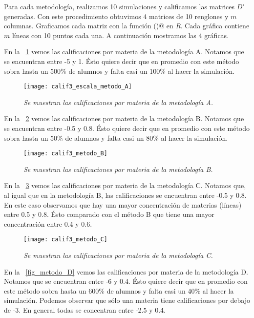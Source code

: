 Para cada metodología, realizamos 10 simulaciones y calificamos las matrices $D'$ generadas. Con este procedimiento obtuvimos 4 matrices de 10 renglones y $m$ columnas. Graficamos cada matriz con la función \verb@matplot()@ en \textit{R}. Cada gráfica contiene $m$ líneas con 10 puntos cada una. A continuación mostramos las 4 gráficas.

En la \figurename{~\ref{fig_metodo_A}} vemos las calificaciones por materia de la metodología A. Notamos que se encuentran entre -5 y 1. Ésto quiere decir que en promedio con este método sobra hasta un 500\% de alumnos y falta casi un 100\% al hacer la simulación.

\begin{figure}[H]
\centering
\texttt{[image: calif3\_escala\_metodo\_A]} %
\caption[\textit{Metodología A}]{\textit{Se muestran las calificaciones por materia de la metodología A.}}\label{fig_metodo_A}
\end{figure} 


En la \figurename{~\ref{fig_metodo_B}} vemos las calificaciones por materia de la metodología B. Notamos que se encuentran entre -0.5 y 0.8. Ésto quiere decir que en promedio con este método sobra hasta un 50\% de alumnos y falta casi un 80\% al hacer la simulación.

\begin{figure}[H]
\centering
\texttt{[image: calif3\_metodo\_B]} %
\caption[\textit{Metodología B}]{\textit{Se muestran las calificaciones por materia de la metodología B.}}\label{fig_metodo_B}
\end{figure} 


En la \figurename{~\ref{fig_metodo_C}} vemos las calificaciones por materia de la metodología C. Notamos que, al igual que en la metodología B, las calificaciones se encuentran entre -0.5 y 0.8. En este caso observamos que hay una mayor concentración de materias (líneas) entre 0.5 y 0.8. Ésto comparado con el método B que tiene una mayor concentración entre 0.4 y 0.6.

\begin{figure}[H]
\centering
\texttt{[image: calif3\_metodo\_C]} %
\caption[\textit{Metodología C}]{\textit{Se muestran las calificaciones por materia de la metodología C.}}\label{fig_metodo_C}
\end{figure}


En la \figurename{~\ref{fig_metodo_D}} vemos las calificaciones por materia de la metodología D. Notamos que se encuentran entre -6 y 0.4. Ésto quiere decir que en promedio con este método sobra hasta un 600\% de alumnos y falta casi un 40\% al hacer la simulación. Podemos observar que sólo una materia tiene calificaciones por debajo de -3. En general todas se concentran entre -2.5 y 0.4.

